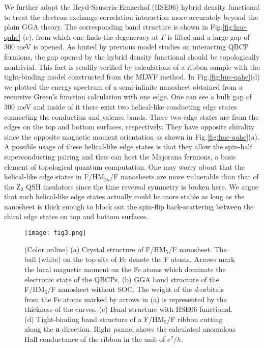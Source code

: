 \documentclass[twocolumn,english,prb,showpacs]{revtex4-1}
\begin{document}
We further adopt the Heyd-Scuseria-Ernzerhof (HSE06) hybrid density functional \cite{HSE06} to treat the electron exchange-correlation interaction more accurately beyond the plain GGA theory. The corresponding band structure is shown in Fig.\ref{fig:huc-qahe} (c), from which one finds the degeneracy at $\Gamma$ is lifted and a large gap of 300 meV is opened. As hinted by previous model studies on interacting QBCP fermions\cite{SunKai_PRL,Zhu2016Interaction, Wu2016Diagnosis}, the gap opened by the hybrid density functional should be topologically nontrivial. This fact is readily verified by calculations of a ribbon sample with the tight-binding model constructed from the MLWF method. In Fig.\ref{fig:huc-qahe}(d) we plotted the energy spectrum of a semi-infinite nanosheet obtained from a recursive Green's function calculation with one edge. One can see a bulk gap of 300 meV and inside of it there exist two helical-like conducting edge states connecting the conduction and valence bands. {These two edge states are from the edges on the top and bottom surfaces, respectively. They have opposite chirality since the opposite magnetic moment orientation as shown in Fig.\ref{fig:huc-qahe}(a).} A possible usage of these helical-like edge states is that they allow the spin-half superconducting pairing and thus can host the Majorana fermions, a basic element of topological quantum computation.\cite{AliceaMF2012} One may worry about that the helical-like edge states in F/HM$_{2n}$/F nanosheets are more vulnerable than that of the Z$_2$ QSH insulators since the time reversal symmetry is broken here. We argue that such helical-like edge states actually could be more stable as long as the nanosheet is thick enough to block out the spin-flip back-scattering between the chiral edge states on top and bottom surfaces.

\begin{figure}
\centering{}
\texttt{[image: fig3.png]}
\caption{(Color online)
{(a) Crystal structure of F/HM$_5$/F nanosheet. The ball (white) on the top-site of Fe denote the F atoms. Arrows mark the local magnetic moment on the Fe atoms which dominate the electronic state of the QBCPs. (b) GGA band structure of the F/HM$_5$/F nanosheet without SOC. The weight of the $d$-orbitals from the Fe atoms marked by arrows in (a) is represented by the thickness of the curves. (c) Band structure with HSE06 functional. (d) Tight-binding band structure of a F/HM$_5$/F ribbon cutting along the $\textbf{a}$ direction. Right pannel shows the calculated anomalous Hall conductance of the ribbon in the unit of $e^2/h$.}
\label{fig:uc}}
\end{figure}
\end{document}

